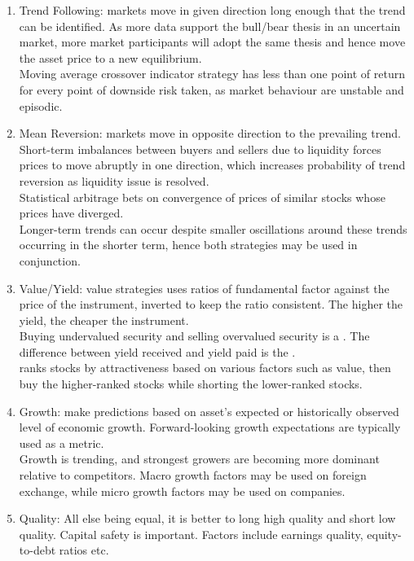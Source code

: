 \documentclass[a4paper,oneside,openany]{book}
\begin{document}
\begin{definition} 
\begin{enumerate}[label=\roman*.]
\setlength{\itemsep}{0pt}
\item Trend Following: markets move in given direction long enough that the trend can be identified. As more data support the bull/bear thesis in an uncertain market, more market participants will adopt the same thesis and hence move the asset price to a new equilibrium.\\
Moving average crossover indicator strategy has less than one point of return for every point of downside risk taken, as market behaviour are unstable and episodic.
\item Mean Reversion: markets move in opposite direction to the prevailing trend. Short-term imbalances between buyers and sellers due to liquidity forces prices to move abruptly in one direction, which increases probability of trend reversion as liquidity issue is resolved.\\
Statistical arbitrage bets on convergence of prices of similar stocks whose prices have diverged.\\
Longer-term trends can occur despite smaller oscillations around these trends occurring in the shorter term, hence both strategies may be used in conjunction.
\item Value/Yield:  value strategies uses ratios of fundamental factor against the price of the instrument, inverted to keep the ratio consistent. The higher the yield, the cheaper the instrument.\\
Buying undervalued security and selling overvalued security is a . The difference between yield received and yield paid is the .\\
 ranks stocks by attractiveness based on various factors such as value, then buy the higher-ranked stocks while shorting the lower-ranked stocks.
\item Growth: make predictions based on asset's expected or historically observed level of economic growth. Forward-looking growth expectations are typically used as a metric.\\
Growth is trending, and strongest growers are becoming more dominant relative to competitors. Macro growth factors may be used on foreign exchange, while micro growth factors may be used on companies.
\item Quality: All else being equal, it is better to long high quality and short low quality. Capital safety is important. Factors include earnings quality, equity-to-debt ratios etc.
\end{enumerate}
\end{definition}
\end{document}
